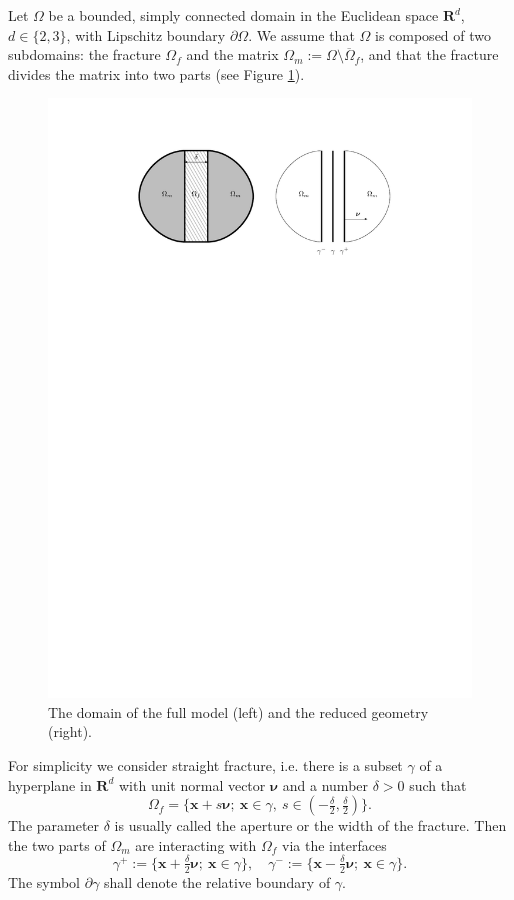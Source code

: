 \documentclass[a4paper]{article}
\def\nnu{\vc\nu}
\def\prtl{\partial}
\def\Real{{\mathbf R}}
\def\vc#1{\mathbf{\boldsymbol{#1}}}     %
\def\xx{\vc x}
\newcommand{\eqs}[1]{\begin{equation*}#1\end{equation*}}
\begin{document}
Let $\Omega$ be a bounded, simply connected domain in the Euclidean space $\Real^d$, $d\in\{2,3\}$, with Lipschitz boundary $\partial\Omega$.
We assume that $\Omega$ is composed of two subdomains: the fracture $\Omega_f$ and the matrix $\Omega_m:=\Omega\setminus\overline\Omega_f$, and that the fracture divides the matrix into two parts (see Figure \ref{fig:omegas}).
\begin{figure}[h]
\centering
\includegraphics[width=\textwidth]{figures/omegas}
\caption{The domain of the full model (left) and the reduced geometry (right).}
\label{fig:omegas}
\end{figure}
For simplicity we consider straight fracture, i.e. there is a subset $\gamma$ of a hyperplane in $\Real^d$ with unit normal vector $\nnu$ and a number $\delta>0$ such that
\eqs{ \Omega_f = \{\xx+s\nnu;~\xx\in\gamma,~s\in(-\tfrac\delta2,\tfrac\delta2)\}. }
The parameter $\delta$ is usually called the aperture or the width of the fracture.
Then the two parts of $\Omega_m$ are interacting with $\Omega_f$ via the interfaces
\eqs{ \gamma^+ := \{\xx+\tfrac\delta2\nnu;~\xx\in\gamma\},\quad \gamma^- := \{\xx-\tfrac\delta2\nnu;~\xx\in\gamma\}. }
The symbol $\prtl\gamma$ shall denote the relative boundary of $\gamma$.
\end{document}
